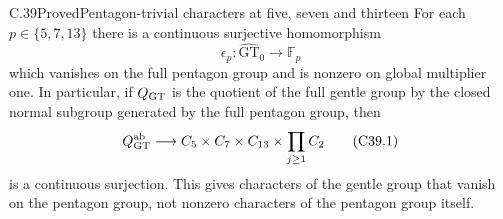 \begin{statement}{C.39}{Proved}{Pentagon-trivial characters at five, seven and thirteen}
For each \(p\in\{5,7,13\}\) there is a continuous surjective
homomorphism
\[
              \epsilon_p:\widehat{\mathrm{GT}}_0
                                      \longrightarrow\mathbb F_p
\]
which vanishes on the full pentagon group and is nonzero
on global multiplier one.
In particular, if \(Q_{\rm GT}\) is the quotient of the full
gentle group by the closed normal subgroup generated by the
full pentagon group, then
\[
          Q_{\rm GT}^{\rm ab}\longrightarrow
             C_5\times C_7\times C_{13}
                       \times\prod_{j\geq1}C_2
                                                               \tag{C39.1}
\]
is a continuous surjection.
This gives characters of the gentle group that vanish on
the pentagon group, not nonzero characters of the pentagon
group itself.
\end{statement}
